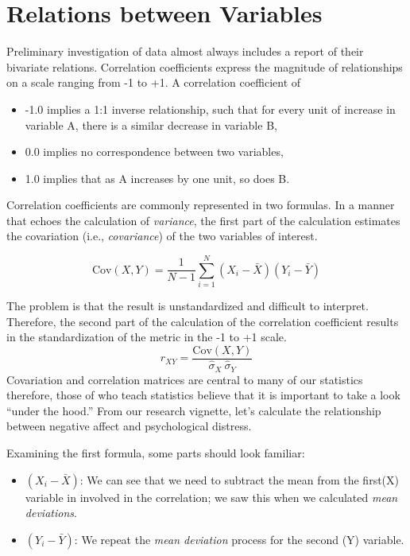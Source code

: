 \documentclass[
  11pt,
]{book}
\providecommand{\tightlist}{%
  \setlength{\itemsep}{0pt}\setlength{\parskip}{0pt}}
\begin{document}
\hypertarget{relations-between-variables}{%
\section{Relations between Variables}\label{relations-between-variables}}

Preliminary investigation of data almost always includes a report of their bivariate relations. Correlation coefficients express the magnitude of relationships on a scale ranging from -1 to +1. A correlation coefficient of

\begin{itemize}
\tightlist
\item
  -1.0 implies a 1:1 inverse relationship, such that for every unit of increase in variable A, there is a similar decrease in variable B,
\item
  0.0 implies no correspondence between two variables,
\item
  1.0 implies that as A increases by one unit, so does B.
\end{itemize}

Correlation coefficients are commonly represented in two formulas. In a manner that echoes the calculation of \emph{variance}, the first part of the calculation estimates the covariation (i.e., \emph{covariance}) of the two variables of interest.

\[
\mbox{Cov}(X,Y) = \frac{1}{N-1} \sum_{i=1}^N \left( X_i - \bar{X} \right) \left( Y_i - \bar{Y} \right)
\]

The problem is that the result is unstandardized and difficult to interpret. Therefore, the second part of the calculation of the correlation coefficient results in the standardization of the metric in the -1 to +1 scale. \[
r_{XY}  = \frac{\mbox{Cov}(X,Y)}{ \hat{\sigma}_X \ \hat{\sigma}_Y}
\] Covariation and correlation matrices are central to many of our statistics therefore, those of who teach statistics believe that it is important to take a look ``under the hood.'' From our research vignette, let's calculate the relationship between negative affect and psychological distress.

Examining the first formula, some parts should look familiar:

\begin{itemize}
\tightlist
\item
  \((X_i - \bar{X})\): We can see that we need to subtract the mean from the first(X) variable in involved in the correlation; we saw this when we calculated \emph{mean deviations}.
\item
  \((Y_i - \bar{Y})\): We repeat the \emph{mean deviation} process for the second (Y) variable.
\end{itemize}
\end{document}
